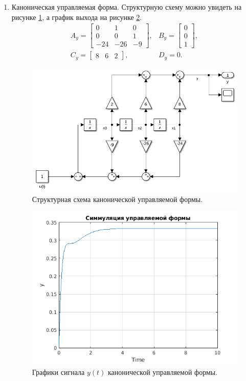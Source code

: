 \begin{enumerate}
    \item Каноническая управляемая форма. Структурную схему можно увидеть
    на рисунке \ref{fig:task2_slx_ctrl}, а график выхода на рисунке 
    \ref{fig:task2_out_ctrl_y}.
\begin{equation*}
    \begin{array}{cc}
        A_y=\begin{bmatrix}
            0 & 1 & 0 \\
            0 & 0 & 1 \\
            -24 & -26 & -9
        \end{bmatrix}, &
        B_y=\begin{bmatrix}
            0 \\ 0 \\ 1
        \end{bmatrix}, \\[7mm]
        C_y=\begin{bmatrix}
            8 & 6 & 2
        \end{bmatrix}, &
        D_y=0.
    \end{array}
\end{equation*}
\begin{figure}[htbp]
    \centering
    \includegraphics[width=\linewidth]{figs/task_2_slx_ctrl.png}
    \caption{Структурная схема канонической управляемой формы.}
    \label{fig:task2_slx_ctrl}
\end{figure}
\begin{figure}[htbp]
    \centering
    \includegraphics[width=0.7\linewidth]{figs/task_2_out_ctrl_y.png}
    \caption{Графики сигнала $y(t)$ канонической управляемой формы.}
    \label{fig:task2_out_ctrl_y}
\end{figure}


\end{enumerate}
